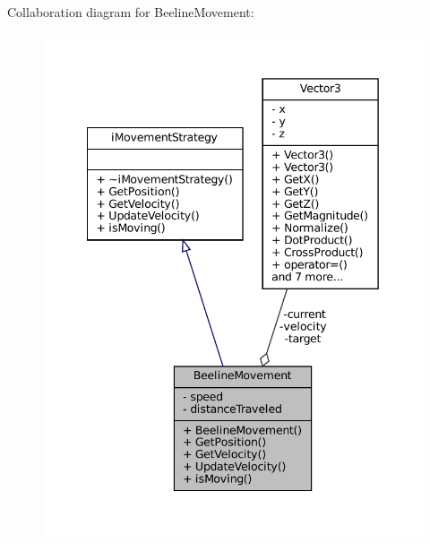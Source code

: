 Collaboration diagram for Beeline\+Movement\+:\nopagebreak
\begin{figure}[H]
\begin{center}
\leavevmode
\includegraphics[width=342pt]{classBeelineMovement__coll__graph}
\end{center}
\end{figure}
